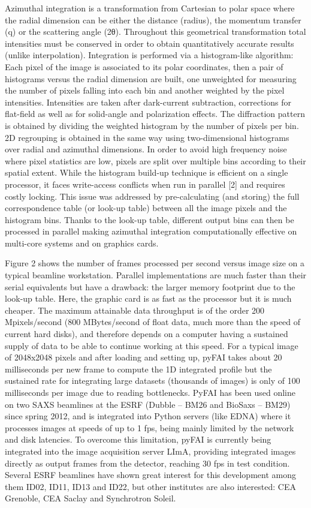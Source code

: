 Azimuthal integration is a transformation from Cartesian to polar space where the radial dimension can be either the distance (radius), the momentum transfer (q) or the scattering angle (2θ).
Throughout this geometrical transformation total intensities must be conserved in order to obtain quantitatively accurate results (unlike interpolation). 
Integration is performed via a histogram-like algorithm: 
Each pixel of the image is associated to its polar coordinates, then a pair of histograms versus the radial dimension are built, one unweighted for measuring the number of pixels falling into each bin and another weighted by the pixel intensities.
Intensities are taken after dark-current subtraction, corrections for flat-field as well as for solid-angle and polarization effects.
The diffraction pattern is obtained by dividing the weighted histogram by the number of pixels per bin. 
2D regrouping is obtained in the same way using two-dimensional histograms over
radial and azimuthal dimensions.
In order to avoid high frequency noise where pixel statistics are low, pixels are split over multiple bins according to their spatial extent. 
While the histogram build-up technique is efficient on a single processor, it faces write-access conflicts when run in parallel [2] and requires costly locking. 
This issue was addressed by pre-calculating (and storing) the full correspondence table (or look-up table) between all the image pixels and the histogram bins. 
Thanks to the look-up table, different output bins can then be processed in parallel making azimuthal integration computationally effective on multi-core systems and on graphics cards.

Figure 2 shows the number of frames processed per second versus image size on a typical beamline workstation. 
Parallel implementations are much faster than their serial equivalents but have a drawback: the larger memory footprint due to the look-up table. 
Here, the graphic card is as fast as the processor but it is much cheaper.
The maximum attainable data throughput is of the order 200 Mpixels/second (800 MBytes/second of float data, much more than the speed of current hard disks), and therefore depends on a computer having a sustained supply of data to be able to continue working at this speed.
For a typical image of 2048x2048 pixels and after loading and setting up, pyFAI takes about 20 milliseconds per new frame to compute the 1D integrated profile but the sustained rate for integrating large datasets (thousands of images) is only of 100 milliseconds per image due to reading bottlenecks.
PyFAI has been used online on two SAXS beamlines at the ESRF (Dubble – BM26 and BioSaxs – BM29) since spring 2012, and is integrated into Python servers (like EDNA) where it processes images at speeds of up to 1 fps, being mainly limited by the network and disk latencies.
To overcome this limitation, pyFAI is currently being integrated into the image acquisition server LImA, providing integrated images directly as output frames from the detector, reaching 30 fps in test condition.
Several ESRF beamlines have shown great interest for this development among them ID02, ID11, ID13 and ID22, but other institutes are also interested: CEA Grenoble, CEA Saclay and Synchrotron Soleil.


